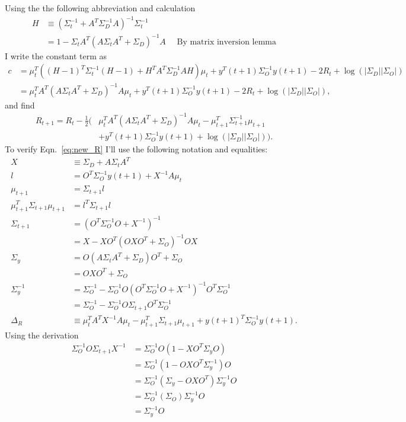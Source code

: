 \documentclass[12pt]{article}
\newcommand{\ti}[2]{{#1}{(#2)}}                         %
\newcommand{\logdet}{\log\left(\left|\Sigma_D\right| \left| \Sigma_O
    \right| \right)}
\begin{document}
Using the the following abbreviation and calculation
\begin{align*}
  H &\equiv (\Sigma_t^{-1} + A^T \Sigma_D^{-1}A)^{-1} \Sigma_t^{-1} \\
  &= 1 - \Sigma_t A^T(A\Sigma_t A^T + \Sigma_D)^{-1} A \quad \text{ By
    matrix inversion lemma}
\end{align*}
I write the constant term as
\begin{align*}
  c &= \mu_t^T \left( (H-1)^T\Sigma_t^{-1} (H-1) + H^TA^T\Sigma_D^{-1}
    AH \right) \mu_t + \ti{y^T}{t+1} \Sigma_O^{-1}
  \ti{y}{t+1} - 2R_t + \logdet\\
  &= \mu_t^T  A^T(A\Sigma_t A^T + \Sigma_D)^{-1}A \mu_t
  + \ti{y^T}{t+1} \Sigma_O^{-1} \ti{y}{t+1} - 2R_t  + \logdet,
\end{align*}
and find
\begin{align*}
  R_{t+1} = R_t -\frac{1}{2} \Big( &
  \mu_t^T  A^T(A\Sigma_t A^T + \Sigma_D)^{-1}A \mu_t 
   - \mu_{t+1}^T \Sigma_{t+1}^{-1} \mu_{t+1} \\
  & + \ti{y^T}{t+1} \Sigma_O^{-1} \ti{y}{t+1} + \logdet \Big).
\end{align*}
To verify Eqn.~\eqref{eq:new_R} I'll use the following notation and
equalities:
\begin{align}
  X &\equiv \Sigma_D + A \Sigma_t A^T \\
  l &= O^T\Sigma_O^{-1} \ti{y}{t+1} + X^{-1} A \mu_t \\
  \mu_{t+1} &= \Sigma_{t+1} l \\
  \mu_{t+1}^T \Sigma_{t+1} \mu_{t+1} &= l^T \Sigma_{t+1} l \\
  \Sigma_{t+1} &= (O^T\Sigma_O^{-1}O + X^{-1})^{-1} \\
  &= X - XO^T(OXO^T + \Sigma_O)^{-1} OX \\
  \Sigma_y &= O(A\Sigma_t A^T + \Sigma_D) O^T + \Sigma_O \\
  &= OXO^T + \Sigma_O \\
  \Sigma_y^{-1} &= \Sigma_O^{-1} - \Sigma_O^{-1} O (O^T\Sigma_O^{-1}O
  + X^{-1})^{-1}O^T \Sigma_O^{-1} \\
  &= \Sigma_O^{-1} - \Sigma_O^{-1} O \Sigma_{t+1}O^T \Sigma_O^{-1} \\
  \Delta_R &\equiv \mu_t^TA^T X^{-1} A \mu_t - \mu_{t+1}^T
  \Sigma_{t+1} \mu_{t+1} + \ti{y}{t+1}^T \Sigma_O^{-1} \ti{y}{t+1}.
\end{align}
Using the derivation
\begin{align*}
  \Sigma_O^{-1} O \Sigma_{t+1} X^{-1} &=
  \Sigma_O^{-1}O(1-XO^T\Sigma_yO) \\
  &= \Sigma_O^{-1}(1-OXO^T\Sigma_y^{-1})O \\
  &= \Sigma_O^{-1}(\Sigma_y-OXO^T)\Sigma_y^{-1}O \\
  &= \Sigma_O^{-1}(\Sigma_O)\Sigma_y^{-1}O \\
  &= \Sigma_y^{-1}O \\
\end{align*}
\end{document}
